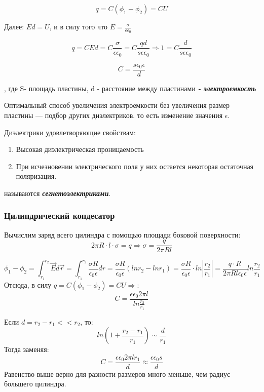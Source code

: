 \documentclass[../main.tex]{subfiles}
\begin{document}
\[q = C(\phi_1 - \phi_2) = CU\]

Далее: $Ed = U$, и в силу того что $E = \frac{\sigma}{\epsilon \epsilon_0}$

\[q = CEd = C\frac{\sigma}{\epsilon \epsilon_0} = C\frac{qd}{s\epsilon \epsilon_0} \Rightarrow 1 = C \frac{d}{s \epsilon \epsilon_0}\]

\[C = \frac{s\epsilon_0\epsilon}{d}\]

\begin{center}
    , где S- площадь пластины, d - расстояние между пластинами
    \newline
    \textbf{\textit{- электроемкость}}
\end{center}

Оптимальный способ увеличения электроемкости без увеличения размер пластины --- подбор других диэлектриков. то есть
изменение значения $\epsilon$.

 Диэлектрики удовлетворяющие свойствам:
\begin{enumerate}
    \item Высокая диэлектрическая проницаемость
    \item При исчезновении электрического поля у них остается некоторая остаточная поляризация.
\end{enumerate}
называются \textit{\textbf{сегнетоэлектриками}}.

\subsubsection{Цилиндрический кондесатор}

Вычислим заряд всего цилиндра с помощью площади боковой поверхности:
\[2 \pi R \cdot l \cdot \sigma = q \Rightarrow \sigma = \frac{q}{2 \pi R l}\]

\[\phi_1 - \phi_2 = \int_{r_1}^{r_2} \vec E d\vec r = \int_{r_1}^{r_2} \frac{\sigma R}{\epsilon_0 \epsilon} dr = \frac{\sigma R}{\epsilon_0 \epsilon}(ln r_2 - ln r_1)
    = \frac{\sigma R}{\epsilon_0 \epsilon} \cdot ln{|\frac{r_2}{r_1}|} = \frac{q \cdot R}{2 \pi R l \epsilon_0 \epsilon} ln{\frac{r_2}{r_1}}\]
Отсюда, в силу $q = C(\phi_1 - \phi_2) = CU \Rightarrow$:
\[C = \frac{\epsilon \epsilon_0 2 \pi l}{ln{\frac{r_2}{r_1}}}\]

Если $d = r_2 - r_1 << r_2$, то:
\[ln(1+ \frac{r_2 - r_1}{r_1}) \sim \frac{d}{r_1}\]
Тогда заменяя:
\[C = \frac{\epsilon \epsilon_0 2 \pi l r_1}{d} \approx \frac{\epsilon \epsilon_0 s}{d}\]
Равенство выше верно для разности размеров много меньше, чем радиус большего цилиндра.
\end{document}
